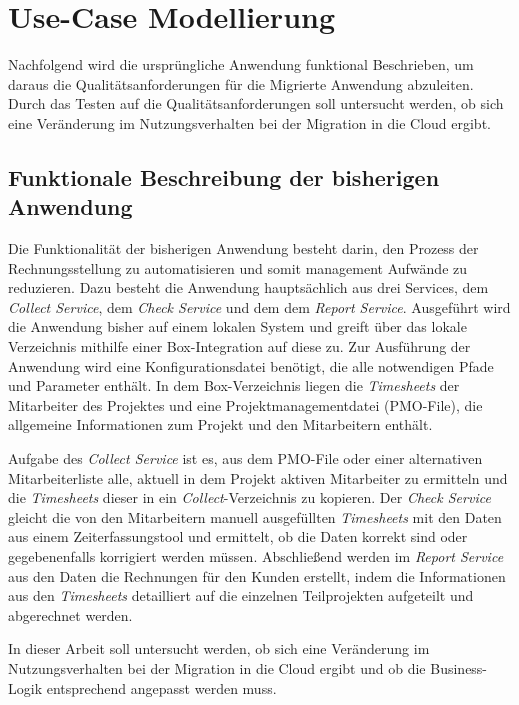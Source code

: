 \section{Use-Case Modellierung}
\label{sec:use-case-modellierung}

Nachfolgend wird die ursprüngliche Anwendung funktional Beschrieben, um daraus die Qualitätsanforderungen für die Migrierte Anwendung abzuleiten. Durch das Testen auf die Qualitätsanforderungen soll untersucht werden, ob sich eine Veränderung im Nutzungsverhalten bei der Migration in die Cloud ergibt.

\subsection{Funktionale Beschreibung der bisherigen Anwendung}
Die Funktionalität der bisherigen Anwendung besteht darin, den Prozess der Rechnungsstellung zu automatisieren und somit management Aufwände zu reduzieren. Dazu besteht die Anwendung hauptsächlich aus drei Services, dem \textit{Collect Service}, dem \textit{Check Service} und dem dem \textit{Report Service}. Ausgeführt wird die Anwendung bisher auf einem lokalen System und greift über das lokale Verzeichnis mithilfe einer \gls{Box}-Integration auf diese zu. Zur Ausführung der Anwendung wird eine Konfigurationsdatei benötigt, die alle notwendigen Pfade und Parameter enthält. In dem \gls{Box}-Verzeichnis liegen die \textit{\glspl{Timesheet}} der Mitarbeiter des Projektes und eine Projektmanagementdatei (PMO-File), die allgemeine Informationen zum Projekt und den Mitarbeitern enthält.

Aufgabe des \textit{Collect Service} ist es, aus dem PMO-File oder einer alternativen Mitarbeiterliste alle, aktuell in dem Projekt aktiven Mitarbeiter zu ermitteln und die \textit{\glspl{Timesheet}} dieser in ein \textit{Collect}-Verzeichnis zu kopieren. Der \textit{Check Service} gleicht die von den Mitarbeitern manuell ausgefüllten \textit{\glspl{Timesheet}} mit den Daten aus einem Zeiterfassungstool und ermittelt, ob die Daten korrekt sind oder gegebenenfalls korrigiert werden müssen. Abschließend werden im \textit{Report Service} aus den Daten die Rechnungen für den Kunden erstellt, indem die Informationen aus den \textit{\glspl{Timesheet}} detailliert auf die einzelnen Teilprojekten aufgeteilt und abgerechnet werden.

In dieser Arbeit soll untersucht werden, ob sich eine Veränderung im Nutzungsverhalten bei der Migration in die Cloud ergibt und ob die Business-Logik entsprechend angepasst werden muss. \pagebreak

